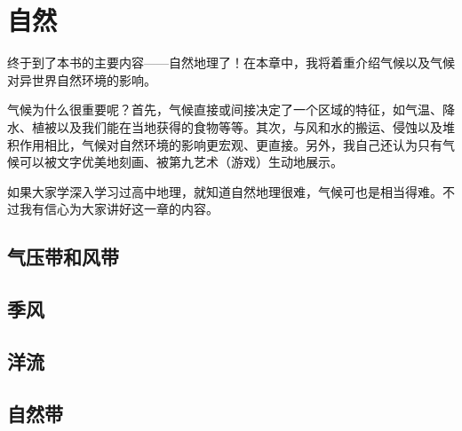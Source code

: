 \chapter{自然}
终于到了本书的主要内容------自然地理了！在本章中，我将着重介绍气候以及气候对异世界自然环境的影响。

气候为什么很重要呢？首先，气候直接或间接决定了一个区域的特征，如气温、降水、植被以及我们能在当地获得的食物等等。其次，与风和水的搬运、侵蚀以及堆积作用相比，气候对自然环境的影响更宏观、更直接。另外，我自己还认为只有气候可以被文字优美地刻画、被第九艺术（游戏）生动地展示。

如果大家学深入学习过高中地理，就知道自然地理很难，气候可也是相当得难。不过我有信心为大家讲好这一章的内容。

\section{气压带和风带}

\section{季风}

\section{洋流}

\section{自然带}
